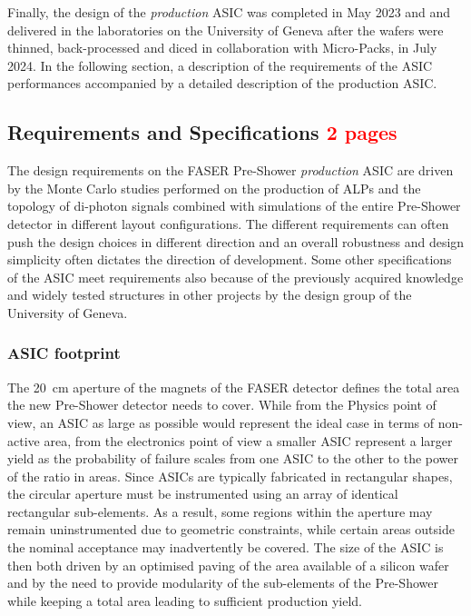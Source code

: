 	Finally, the design of the \textit{production} ASIC was completed in May 2023 and and delivered in the laboratories on the University of Geneva after the wafers were thinned, back-processed and diced in collaboration with Micro-Packs, in July 2024. In the following section, a description of the requirements of the ASIC performances accompanied by a detailed description of the production ASIC. 
	
		\subsection{Requirements and Specifications \textcolor{red}{ 2 pages}}
		The design requirements on the FASER Pre-Shower \textit{production} ASIC are driven by the Monte Carlo studies performed on the production of ALPs and the topology of di-photon signals combined with simulations of the entire Pre-Shower detector in different layout configurations. The different requirements can often push the design choices in different direction and an overall robustness and design simplicity often dictates the direction of development. Some other specifications of the ASIC meet requirements also because of the previously acquired knowledge and widely tested structures in other projects by the design group of the University of Geneva. 
		
		\subsubsection{ASIC footprint}
		The \SI{20}{\centi\meter} aperture of the magnets of the FASER detector defines the total area the new Pre-Shower detector needs to cover. While from the Physics point of view, an ASIC as large as possible would represent the ideal case in terms of non-active area, from the electronics point of view a smaller ASIC represent a larger yield as the probability of failure scales from one ASIC to the other to the power of the ratio in areas. Since ASICs are typically fabricated in rectangular shapes, the circular aperture must be instrumented using an array of identical rectangular sub-elements. As a result, some regions within the aperture may remain uninstrumented due to geometric constraints, while certain areas outside the nominal acceptance may inadvertently be covered. The size of the ASIC is then both driven by an optimised paving of the area available of a silicon wafer and by the need to provide modularity of the sub-elements of the Pre-Shower while keeping a total area leading to sufficient production yield. 
		
